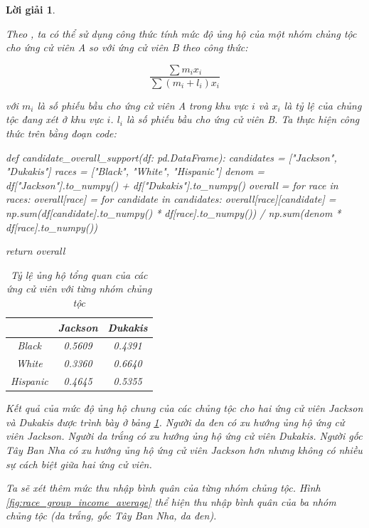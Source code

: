 \documentclass[14pt, a4paper]{article}
\theoremstyle{sltheorem}
\theoremstyle{soltheorem}
\newtheorem*{loigiai}{Lời giải}
\begin{document}
\begin{loigiai}
\begin{enumerate}
    Theo \cite{nolan2001stat}, ta có thể sử dụng công thức tính mức độ ủng hộ của một nhóm chủng tộc cho ứng cử viên A so với ứng cử viên B theo công thức:

    \begin{equation*}
        \dfrac{\sum m_i x_i}{\sum (m_i + l_i)x_i}
    \end{equation*}

    với $m_i$ là số phiếu bầu cho ứng cử viên A trong khu vực $i$ và $x_i$ là tỷ lệ của chủng tộc đang xét ở khu vực $i$.
    $l_i$ là số phiếu bầu cho ứng cử viên B.
    Ta thực hiện công thức trên bằng đoạn code:

\begin{python}
def candidate_overall_support(df: pd.DataFrame):
    candidates = ["Jackson", "Dukakis"]
    races = ["Black", "White", "Hispanic"]
    denom = df["Jackson"].to_numpy() + df["Dukakis"].to_numpy()
    overall = {}
    for race in races:
        overall[race] = {}
        for candidate in candidates:
            overall[race][candidate] = np.sum(df[candidate].to_numpy() * df[race].to_numpy()) / np.sum(denom * df[race].to_numpy())
            
    return overall
\end{python}

    \begin{table}[H]
        \centering
        \begin{tabular}{|c|c|c|}
        \hline
        & Jackson & Dukakis \\
        \hline
        Black & 0.5609 & 0.4391 \\
        \hline
        White & 0.3360 & 0.6640 \\
        \hline
        Hispanic & 0.4645 & 0.5355 \\
        \hline
        \end{tabular}
        \caption{Tỷ lệ ủng hộ tổng quan của các ứng cử viên với từng nhóm chủng tộc}
        \label{tab:overall-support}
    \end{table}

    Kết quả của mức độ ủng hộ chung của các chủng tộc cho hai ứng cử viên Jackson và Dukakis được trình bày ở bảng \ref{tab:overall-support}.
    Người da đen có xu hướng ủng hộ ứng cử viên Jackson.
    Người da trắng có xu hướng ủng hộ ứng cử viên Dukakis.
    Người gốc Tây Ban Nha có xu hướng ủng hộ ứng cử viên Jackson hơn nhưng không có nhiều sự cách biệt giữa hai ứng cử viên.

    Ta sẽ xét thêm mức thu nhập bình quân của từng nhóm chủng tộc.
    Hình \ref{fig:race_group_income_average} thể hiện thu nhập bình quân của ba nhóm chủng tộc (da trắng, gốc Tây Ban Nha, da đen).


\end{enumerate}
\end{loigiai}
\end{document}
